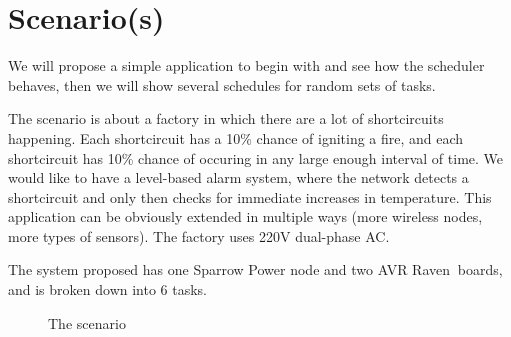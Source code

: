 \chapter{Scenario(s)}

We will propose a simple application to begin with and see how the scheduler behaves, then we will show several
schedules for random sets of tasks.

The scenario is about a factory in which there are a lot of shortcircuits happening. Each shortcircuit has a 10\% chance of
igniting a fire, and each shortcircuit has 10\% chance of occuring in any large enough interval of time. We would like to have
a level-based alarm system, where the network detects a shortcircuit and only then checks for immediate increases in temperature.
This application can be obviously extended in multiple ways (more wireless nodes, more types of sensors). The factory uses
220V dual-phase AC.

The system proposed has one Sparrow Power node and two AVR Raven\texttrademark$\:$ boards, and is broken down into 6 tasks.

\begin{figure}
  \centering
  \caption{The scenario}
\end{figure}

